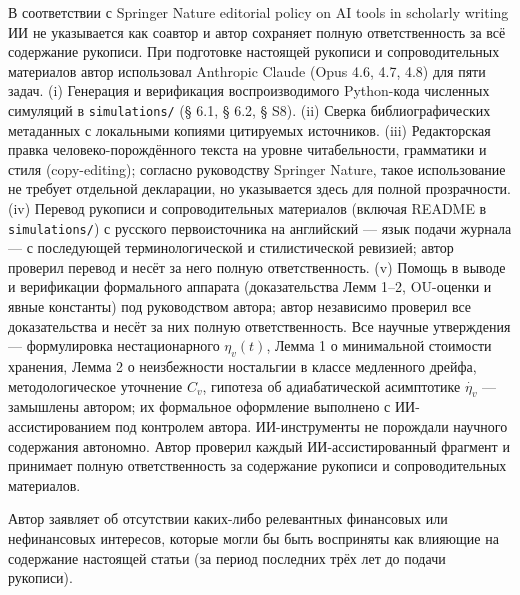 \documentclass[pdflatex,sn-mathphys-ay]{sn-jnl}
\begin{document}
В соответствии с Springer Nature editorial policy on AI tools in scholarly writing ИИ не указывается как соавтор и автор сохраняет полную ответственность за всё содержание рукописи. При подготовке настоящей рукописи и сопроводительных материалов автор использовал Anthropic Claude (Opus 4.6, 4.7, 4.8) для пяти задач. (i) Генерация и верификация воспроизводимого Python-кода численных симуляций в \texttt{simulations/} (§ 6.1, § 6.2, § S8). (ii) Сверка библиографических метаданных с локальными копиями цитируемых источников. (iii) Редакторская правка человеко-порождённого текста на уровне читабельности, грамматики и стиля (copy-editing); согласно руководству Springer Nature, такое использование не требует отдельной декларации, но указывается здесь для полной прозрачности. (iv) Перевод рукописи и сопроводительных материалов (включая README в \texttt{simulations/}) с русского первоисточника на английский --- язык подачи журнала --- с последующей терминологической и стилистической ревизией; автор проверил перевод и несёт за него полную ответственность. (v) Помощь в выводе и верификации формального аппарата (доказательства Лемм 1--2, OU-оценки и явные константы) под руководством автора; автор независимо проверил все доказательства и несёт за них полную ответственность. Все научные утверждения --- формулировка нестационарного \(\eta_v(t)\), Лемма 1 о минимальной стоимости хранения, Лемма 2 о неизбежности ностальгии в классе медленного дрейфа, методологическое уточнение \(C_v\), гипотеза об адиабатической асимптотике \(\dot{\eta_v}\) --- замышлены автором; их формальное оформление выполнено с ИИ-ассистированием под контролем автора. ИИ-инструменты не порождали научного содержания автономно. Автор проверил каждый ИИ-ассистированный фрагмент и принимает полную ответственность за содержание рукописи и сопроводительных материалов.

Автор заявляет об отсутствии каких-либо релевантных финансовых или нефинансовых интересов, которые могли бы быть восприняты как влияющие на содержание настоящей статьи (за период последних трёх лет до подачи рукописи).



\nocite{*}

\end{document}
